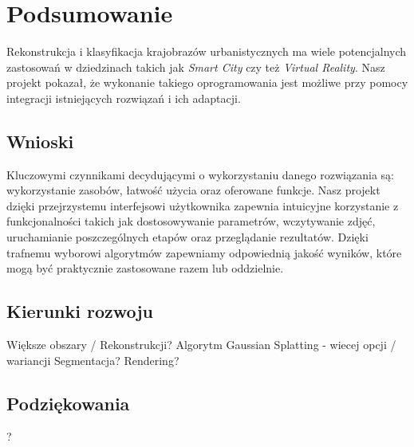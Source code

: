 \section{Podsumowanie}
Rekonstrukcja i klasyfikacja krajobrazów urbanistycznych ma wiele potencjalnych zastosowań w dziedzinach takich jak \textit{Smart City} czy też \textit{Virtual Reality}. Nasz projekt pokazał, że wykonanie takiego oprogramowania jest możliwe przy pomocy integracji istniejących rozwiązań i ich adaptacji. 

\subsection{Wnioski}
Kluczowymi czynnikami decydującymi o wykorzystaniu danego rozwiązania są: wykorzystanie zasobów, łatwość użycia oraz oferowane funkcje. Nasz projekt dzięki przejrzystemu interfejsowi użytkownika zapewnia intuicyjne korzystanie z funkcjonalności takich jak dostosowywanie parametrów, wczytywanie zdjęć, uruchamianie poszczególnych etapów oraz przeglądanie rezultatów. Dzięki trafnemu wyborowi algorytmów zapewniamy odpowiednią jakość wyników, które mogą być praktycznie zastosowane razem lub oddzielnie.  

\subsection{Kierunki rozwoju}
Większe obszary / Rekonstrukcji? 
Algorytm Gaussian Splatting - wiecej opcji / wariancji 
Segmentacja? 
Rendering? 

\subsection{Podziękowania}
?